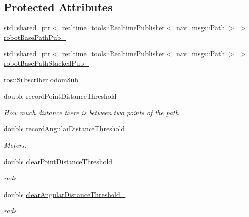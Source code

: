 \subsection*{Protected Attributes}
\begin{DoxyCompactItemize}
\item 
std\+::shared\+\_\+ptr$<$ realtime\+\_\+tools\+::\+Realtime\+Publisher$<$ nav\+\_\+msgs\+::\+Path $>$ $>$ \hyperlink{classcl__move__base__z_1_1odom__tracker_1_1OdomTracker_a40a7cbb6bb6595e250e7c685c781613b}{robot\+Base\+Path\+Pub\+\_\+}
\item 
std\+::shared\+\_\+ptr$<$ realtime\+\_\+tools\+::\+Realtime\+Publisher$<$ nav\+\_\+msgs\+::\+Path $>$ $>$ \hyperlink{classcl__move__base__z_1_1odom__tracker_1_1OdomTracker_a7a2fb23e835ba7d63e69c8db819be876}{robot\+Base\+Path\+Stacked\+Pub\+\_\+}
\item 
ros\+::\+Subscriber \hyperlink{classcl__move__base__z_1_1odom__tracker_1_1OdomTracker_ab55df0e91246e43dff80912dc35a4fee}{odom\+Sub\+\_\+}
\item 
double \hyperlink{classcl__move__base__z_1_1odom__tracker_1_1OdomTracker_a3a1173716d527bd182d04656491e01dd}{record\+Point\+Distance\+Threshold\+\_\+}
\begin{DoxyCompactList}\small\item\em How much distance there is between two points of the path. \end{DoxyCompactList}\item 
double \hyperlink{classcl__move__base__z_1_1odom__tracker_1_1OdomTracker_a1274fe5334c109cd9c2339beb9411441}{record\+Angular\+Distance\+Threshold\+\_\+}
\begin{DoxyCompactList}\small\item\em Meters. \end{DoxyCompactList}\item 
double \hyperlink{classcl__move__base__z_1_1odom__tracker_1_1OdomTracker_a7155d25d0e8dd9f237a79ff503b80e26}{clear\+Point\+Distance\+Threshold\+\_\+}
\begin{DoxyCompactList}\small\item\em rads \end{DoxyCompactList}\item 
double \hyperlink{classcl__move__base__z_1_1odom__tracker_1_1OdomTracker_a1b79dd86745adfb31db822e0c8106282}{clear\+Angular\+Distance\+Threshold\+\_\+}
\begin{DoxyCompactList}\small\item\em rads \end{DoxyCompactList}\item 

\end{DoxyCompactItemize}
